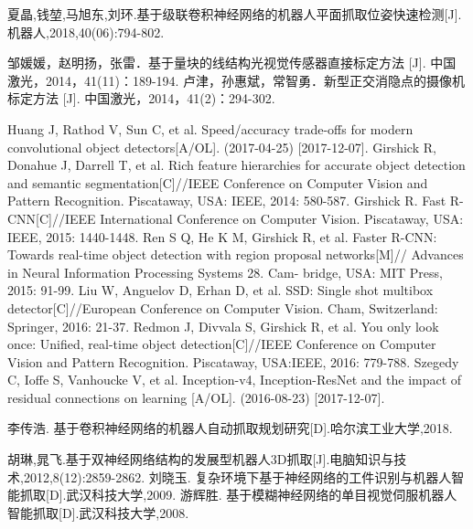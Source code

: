 \begin{thebibliography}{99}
  夏晶,钱堃,马旭东,刘环.基于级联卷积神经网络的机器人平面抓取位姿快速检测[J].机器人,2018,40(06):794-802.
 
 邹媛媛，赵明扬，张雷．基于量块的线结构光视觉传感器直接标定方法 [J]. 中国激光，2014，41(11)：189-194.
 卢津，孙惠斌，常智勇．新型正交消隐点的摄像机标定方法 [J]. 中国激光，2014，41(2)：294-302.

 Huang J, Rathod V, Sun C, et al. Speed/accuracy trade-offs for modern convolutional object detectors[A/OL]. (2017-04-25) [2017-12-07].    
 Girshick R, Donahue J, Darrell T, et al. Rich feature hierarchies for accurate object detection and semantic segmentation[C]//IEEE Conference on Computer Vision and Pattern Recognition. Piscataway, USA: IEEE, 2014: 580-587.
 Girshick R. Fast R-CNN[C]//IEEE International Conference on Computer Vision. Piscataway, USA: IEEE, 2015: 1440-1448.
 Ren S Q, He K M, Girshick R, et al. Faster R-CNN: Towards real-time object detection with region proposal networks[M]// Advances in Neural Information Processing Systems 28. Cam- bridge, USA: MIT Press, 2015: 91-99.
 Liu W, Anguelov D, Erhan D, et al. SSD: Single shot multibox detector[C]//European Conference on Computer Vision. Cham, Switzerland: Springer, 2016: 21-37.
 Redmon J, Divvala S, Girshick R, et al. You only look once: Unified, real-time object detection[C]//IEEE Conference on Computer Vision and Pattern Recognition. Piscataway, USA:IEEE, 2016: 779-788.
 Szegedy C, Ioffe S, Vanhoucke V, et al. Inception-v4, Inception-ResNet and the impact of residual connections on learning [A/OL]. (2016-08-23) [2017-12-07].

 李传浩. 基于卷积神经网络的机器人自动抓取规划研究[D].哈尔滨工业大学,2018.
 
  胡琳,晁飞.基于双神经网络结构的发展型机器人3D抓取[J].电脑知识与技术,2012,8(12):2859-2862.
 刘晓玉. 复杂环境下基于神经网络的工件识别与机器人智能抓取[D].武汉科技大学,2009.
 游辉胜. 基于模糊神经网络的单目视觉伺服机器人智能抓取[D].武汉科技大学,2008.
\end{thebibliography}